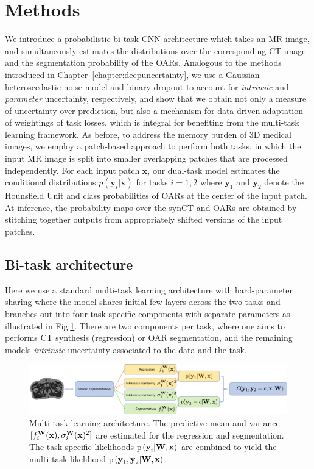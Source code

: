 \section{Methods}
We introduce a probabilistic bi-task CNN architecture which takes an MR image, and simultaneously estimates the distributions over the corresponding CT image and the segmentation probability of the OARs. Analogous to the methods introduced in Chapter~\ref{chapter:deepuncertainty}, we use a Gaussian heteroscedastic noise model \cite{nix1994estimating} and binary dropout \cite{srivastava2014dropout} to account for \textit{intrinsic} and \textit{parameter} uncertainty, respectively, and show that we obtain not only a measure of uncertainty over prediction, but also a mechanism for data-driven adaptation of weightings of task losses, which is integral for benefiting from the multi-task learning framework. As before, to address the memory burden of 3D medical images, we employ a patch-based approach to perform both tasks, in which the input MR image is split into smaller overlapping patches that are processed independently. For each input patch $\mathbf{x}$, our dual-task model estimates the conditional distributions $p(\mathbf{y}_i|\mathbf{x})$ for tasks $i=1,2$ where $\mathbf{y}_1$ and $\mathbf{y}_2$ denote the Hounsfield Unit and class probabilities of OARs at the center of the input patch. At inference, the probability maps over the synCT and OARs are obtained by stitching together outputs from appropriately shifted versions of the input patches.

\subsection{Bi-task architecture}
Here we use a standard multi-task learning architecture with hard-parameter sharing \cite{Caruana1993MultitaskLA} where the model shares initial few layers across the two tasks and branches out into four task-specific components with separate parameters as illustrated in Fig.\ref{fig:diagram}. There are two components per task, where one aims to performs CT synthesis (regression) or OAR segmentation, and the remaining models \emph{intrinsic} uncertainty associated to the data and the task.
	\begin{figure}[!b]
		\centering
\includegraphics[height=0.185\textwidth]{chapter_5/figures/final_for_ryu_MT.pdf}
		\caption{Multi-task learning architecture. The predictive mean and variance $[f^{\mathbf{W}}_i(\text{\textbf{x}}), \sigma_{i}^{\mathbf{W}}(\text{\textbf{x}})^{2}]$ are estimated for the regression and segmentation. The task-specific likelihoods p$\left(\text{\textbf{y}}_{i}|\text{\textbf{W}},\text{\textbf{x}}\right)$ are combined to yield the multi-task likelihood p$\left(\text{\textbf{y}}_{1}, \text{\textbf{y}}_{2}|\text{\textbf{W}},\mathbf{x}\right)$.} 
		\label{fig:diagram}
	\end{figure}
    
